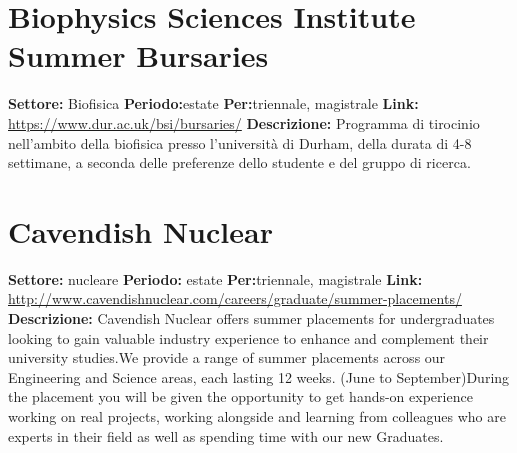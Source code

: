 \documentclass[a4paper,10pt]{article}
\begin{document}
{\section{ Biophysics Sciences Institute Summer Bursaries }
\textbf{Settore:} Biofisica\newline
\textbf{Periodo:}estate \newline
\textbf{Per:}triennale, magistrale\newline
\textbf{Link:} \url{https://www.dur.ac.uk/bsi/bursaries/} \newline
\textbf{Descrizione:}  Programma di tirocinio nell'ambito della biofisica presso l'università di Durham, della durata di 4-8 settimane, a seconda delle preferenze dello studente e del gruppo di ricerca. 

\section{ Cavendish Nuclear }
\textbf{Settore:} nucleare\newline
\textbf{Periodo:} estate \newline
\textbf{Per:}triennale, magistrale\newline
\textbf{Link:} \url{http://www.cavendishnuclear.com/careers/graduate/summer-placements/} \newline
\textbf{Descrizione:}    Cavendish Nuclear offers summer placements for undergraduates looking to gain valuable industry experience to enhance and complement their university studies.We provide a range of summer placements  across our Engineering and Science areas, each lasting 12 weeks. (June to September)During the placement you will be given the opportunity to get hands-on experience working on real projects, working  alongside and learning from colleagues who are experts in their field as well as spending time with our new Graduates.  

}
\end{document}
